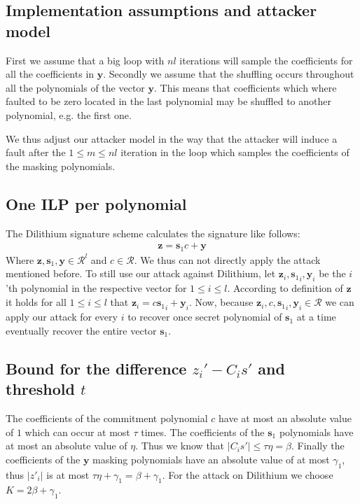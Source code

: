 \documentclass[a4paper,titlepage]{article}
\begin{document}
\subsection{Implementation assumptions and attacker model}
First we assume that a big loop with $nl$ iterations will sample the coefficients for all the coefficients in $\bm{y}$. Secondly we assume that the shuffling occurs throughout all the polynomials of the vector $\bm{y}$. This means that coefficients which where faulted to be zero located in the last polynomial may be shuffled to another polynomial, e.g. the first one.

We thus adjust our attacker model in the way that the attacker will induce a fault after the $1 \leq m \leq nl$ iteration in the loop which samples the coefficients of the masking polynomials.

\subsection{One ILP per polynomial}
The Dilithium signature scheme calculates the signature like follows:
\begin{align}
	\bm{z} = \bm{s}_{1} c + \bm{y}
\end{align}
Where $\bm{z}, \bm{s}_{1}, \bm{y} \in \mathcal{R}^{l}$ and $c \in \mathcal{R}$. We thus can not directly apply the attack mentioned before.
To still use our attack against Dilithium, let $\bm{z}_{i}, {\bm{s}_{1}}_{i}, \bm{y}_{i}$ be the $i$'th polynomial in the respective vector for $1 \leq i \leq l$.
According to definition of $\bm{z}$ it holds for all $1 \leq i \leq l$ that $\bm{z}_{i} = c {\bm{s}_{1}}_{i} + \bm{y}_{i}$. Now, because $\bm{z}_{i}, c, {\bm{s}_{1}}_{i}, \bm{y}_{i} \in \mathcal{R}$ we can apply our attack for every $i$ to recover once secret polynomial of $\bm{s}_{1}$ at a time eventually recover the entire vector $\bm{s}_{1}$.

\subsection{Bound for the difference $z_{i}' - C_{i}s'$ and threshold $t$}
The coefficients of the commitment polynomial $c$ have at most an absolute value of $1$ which can occur at most $\tau$ times. The coefficients of the $\bm{s}_{1}$ polynomials have at most an absolute value of $\eta$. Thus we know that $\lvert  C_{i}s' \rvert \leq \tau \eta = \beta$. Finally the coefficients of the $\bm{y}$ masking polynomials have an absolute value of at most $\gamma_{1}$, thus $\lvert z'_{i} \rvert$ is at most $\tau \eta + \gamma_{1} = \beta + \gamma_{1}$. For the attack on Dilithium we choose $K = 2 \beta + \gamma_{1}$.
\end{document}
